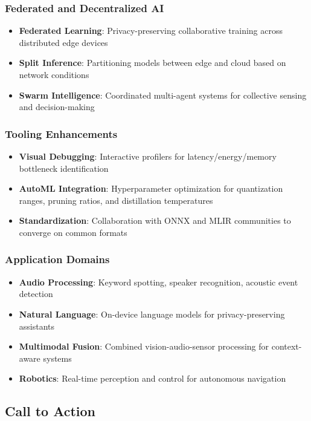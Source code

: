 \subsubsection{Federated and Decentralized AI}
\begin{itemize}
\item \textbf{Federated Learning}: Privacy-preserving collaborative training across distributed edge devices
\item \textbf{Split Inference}: Partitioning models between edge and cloud based on network conditions
\item \textbf{Swarm Intelligence}: Coordinated multi-agent systems for collective sensing and decision-making
\end{itemize}

\subsubsection{Tooling Enhancements}
\begin{itemize}
\item \textbf{Visual Debugging}: Interactive profilers for latency/energy/memory bottleneck identification
\item \textbf{AutoML Integration}: Hyperparameter optimization for quantization ranges, pruning ratios, and distillation temperatures
\item \textbf{Standardization}: Collaboration with ONNX and MLIR communities to converge on common formats
\end{itemize}

\subsubsection{Application Domains}
\begin{itemize}
\item \textbf{Audio Processing}: Keyword spotting, speaker recognition, acoustic event detection
\item \textbf{Natural Language}: On-device language models for privacy-preserving assistants
\item \textbf{Multimodal Fusion}: Combined vision-audio-sensor processing for context-aware systems
\item \textbf{Robotics}: Real-time perception and control for autonomous navigation
\end{itemize}

\subsection{Call to Action}

